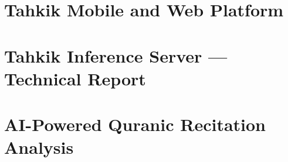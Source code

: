 \documentclass[12pt,a4paper,openany]{report}
\begin{document}






\tableofcontents
\listoffigures
\listoftables

\newpage
{}
\setcounter{page}{1}

\part{Tahkik Mobile and Web Platform}






\part{Tahkik Inference Server --- Technical Report}





\part{AI-Powered Quranic Recitation Analysis}






\end{document}
